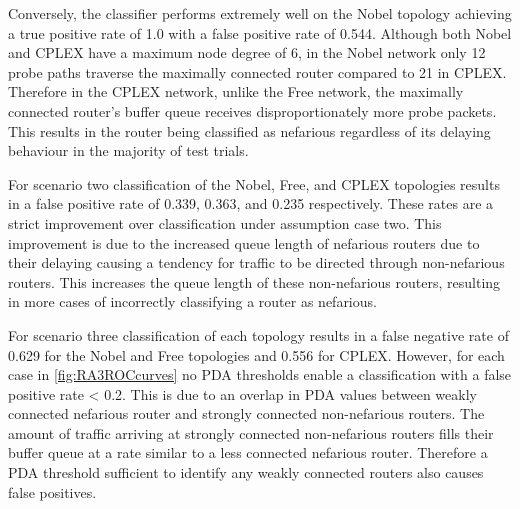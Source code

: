Conversely, the classifier performs extremely well on the Nobel topology achieving a true positive rate of 1.0 with a false positive rate of 0.544. Although both Nobel and CPLEX have a maximum node degree of 6, in the Nobel network only 12 probe paths traverse the maximally connected router compared to 21 in CPLEX. Therefore in the CPLEX network, unlike the Free network, the maximally connected router's buffer queue receives disproportionately more probe packets. This results in the router being classified as nefarious regardless of its delaying behaviour in the majority of test trials.\par
For scenario two classification of the Nobel, Free, and CPLEX topologies results in a false positive rate of 0.339, 0.363, and 0.235 respectively. These rates are a strict improvement over classification under assumption case two. This improvement is due to the increased queue length of nefarious routers due to their delaying causing a tendency for traffic to be directed through non-nefarious routers. This increases the queue length of these non-nefarious routers, resulting in more cases of incorrectly classifying a router as nefarious.\par
For scenario three classification of each topology results in a false negative rate of 0.629 for the Nobel and Free topologies and 0.556 for CPLEX. However, for each case in \cref{fig:RA3ROCcurves} no PDA thresholds enable a classification with a false positive rate < 0.2. This is due to an overlap in PDA values between weakly connected nefarious router and strongly connected non-nefarious routers. The amount of traffic arriving at strongly connected non-nefarious routers fills their buffer queue at a rate similar to a less connected nefarious router. Therefore a PDA threshold sufficient to identify any weakly connected routers also causes false positives.\par

